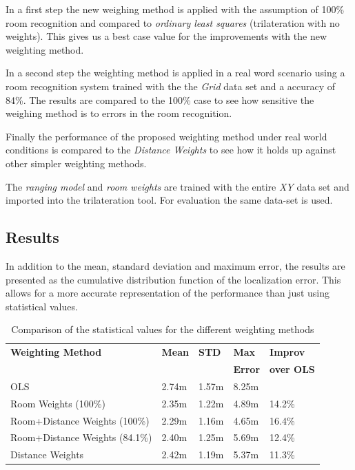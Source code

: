 In a first step the new weighing method is applied with the assumption of 100\% room recognition and compared to \emph{ordinary least squares} (trilateration with no weights). This gives us a best case value for the improvements with the new weighting method.

In a second step the weighting method is applied in a real word scenario using a room recognition system trained with the the \emph{Grid} data set and a accuracy of 84\%. The results are compared to the 100\% case to see how sensitive the weighing method is to errors in the room recognition.

Finally the performance of the proposed weighting method under real world conditions is compared to the \emph{Distance Weights} to see how it holds up against other simpler weighting methods.

The \emph{ranging model} and \emph{room weights} are trained with the entire \emph{XY} data set and imported into the trilateration tool. For evaluation the same data-set is used.

\subsection{Results}
In addition to the mean, standard deviation and maximum error, the results are presented as the cumulative distribution function of the localization error. This allows for a more accurate representation of the performance than just using statistical values.

\begin{table}[hb]
\centering
\begin{tabular}{l l l l l}
\toprule
\textbf{Weighting Method}&\textbf{Mean}&\textbf{STD}&\textbf{Max}&\textbf{Improv}\\
&&\textbf{}&\textbf{Error}&\textbf{over OLS}\\
\midrule
OLS&2.74m&1.57m&8.25m&\\
Room Weights (100\%)&2.35m&1.22m&4.89m&14.2\%\\
Room+Distance Weights (100\%)&2.29m&1.16m&4.65m&16.4\%\\
Room+Distance Weights (84.1\%)&2.40m&1.25m&5.69m&12.4\%\\
Distance Weights&2.42m&1.19m&5.37m&11.3\%\\
\bottomrule
\end{tabular}
\caption[Weighting method comparison]{Comparison of the statistical values for the different weighting methods}
\label{tab:WeightingStatisticalValues}
\end{table}

